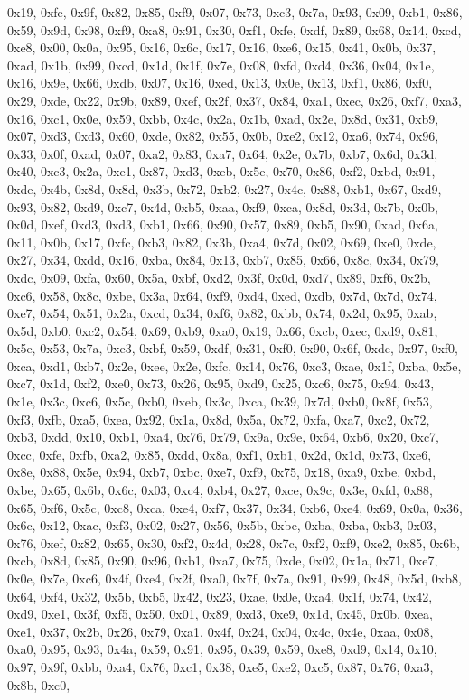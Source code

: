 \documentclass[
]{book}
\begin{document}
0x19, 0xfe, 0x9f, 0x82, 0x85, 0xf9, 0x07, 0x73, 0xc3, 0x7a, 0x93, 0x09, 0xb1, 0x86, 0x59, 0x9d, 0x98, 0xf9, 0xa8, 0x91, 0x30, 0xf1, 0xfe, 0xdf, 0x89, 0x68, 0x14, 0xcd, 0xe8, 0x00, 0x0a, 0x95, 0x16, 0x6c, 0x17, 0x16, 0xe6, 0x15, 0x41, 0x0b, 0x37, 0xad, 0x1b, 0x99, 0xcd, 0x1d, 0x1f, 0x7e, 0x08, 0xfd, 0xd4, 0x36, 0x04, 0x1e, 0x16, 0x9e, 0x66, 0xdb, 0x07, 0x16, 0xed, 0x13, 0x0e, 0x13, 0xf1, 0x86, 0xf0, 0x29, 0xde, 0x22, 0x9b, 0x89, 0xef, 0x2f, 0x37, 0x84, 0xa1, 0xec, 0x26, 0xf7, 0xa3, 0x16, 0xc1, 0x0e,
0x59, 0xbb, 0x4c, 0x2a, 0x1b, 0xad, 0x2e, 0x8d, 0x31, 0xb9, 0x07, 0xd3, 0xd3, 0x60, 0xde, 0x82, 0x55, 0x0b, 0xe2, 0x12, 0xa6, 0x74, 0x96, 0x33, 0x0f, 0xad, 0x07, 0xa2, 0x83, 0xa7, 0x64, 0x2e, 0x7b, 0xb7, 0x6d, 0x3d, 0x40, 0xc3, 0x2a, 0xe1, 0x87, 0xd3, 0xeb, 0x5e, 0x70, 0x86, 0xf2, 0xbd, 0x91, 0xde, 0x4b, 0x8d, 0x8d, 0x3b, 0x72, 0xb2, 0x27, 0x4c, 0x88, 0xb1, 0x67, 0xd9, 0x93, 0x82, 0xd9, 0xc7, 0x4d, 0xb5, 0xaa, 0xf9, 0xca, 0x8d, 0x3d, 0x7b, 0x0b, 0x0d, 0xef, 0xd3, 0xd3, 0xb1, 0x66, 0x90, 0x57, 0x89,
0xb5, 0x90, 0xad, 0x6a, 0x11, 0x0b, 0x17, 0xfc, 0xb3, 0x82, 0x3b, 0xa4, 0x7d, 0x02, 0x69, 0xe0, 0xde, 0x27, 0x34, 0xdd, 0x16, 0xba, 0x84, 0x13, 0xb7, 0x85, 0x66, 0x8c, 0x34, 0x79, 0xdc, 0x09, 0xfa, 0x60, 0x5a, 0xbf, 0xd2, 0x3f, 0x0d, 0xd7, 0x89, 0xf6, 0x2b, 0xc6, 0x58, 0x8c, 0xbe, 0x3a, 0x64, 0xf9, 0xd4, 0xed, 0xdb, 0x7d, 0x7d, 0x74, 0xe7, 0x54, 0x51, 0x2a, 0xcd, 0x34, 0xf6, 0x82, 0xbb, 0x74, 0x2d, 0x95, 0xab, 0x5d, 0xb0, 0xc2, 0x54, 0x69, 0xb9, 0xa0, 0x19, 0x66, 0xcb, 0xec, 0xd9, 0x81, 0x5e, 0x53,
0x7a, 0xe3, 0xbf, 0x59, 0xdf, 0x31, 0xf0, 0x90, 0x6f, 0xde, 0x97, 0xf0, 0xca, 0xd1, 0xb7, 0x2e, 0xee, 0x2e, 0xfc, 0x14, 0x76, 0xc3, 0xae, 0x1f, 0xba, 0x5e, 0xc7, 0x1d, 0xf2, 0xe0, 0x73, 0x26, 0x95, 0xd9, 0x25, 0xc6, 0x75, 0x94, 0x43, 0x1e, 0x3c, 0xc6, 0x5c, 0xb0, 0xeb, 0x3c, 0xca, 0x39, 0x7d, 0xb0, 0x8f, 0x53, 0xf3, 0xfb, 0xa5, 0xea, 0x92, 0x1a, 0x8d, 0x5a, 0x72, 0xfa, 0xa7, 0xc2, 0x72, 0xb3, 0xdd, 0x10, 0xb1, 0xa4, 0x76, 0x79, 0x9a, 0x9e, 0x64, 0xb6, 0x20, 0xc7, 0xcc, 0xfe, 0xfb, 0xa2, 0x85, 0xdd,
0x8a, 0xf1, 0xb1, 0x2d, 0x1d, 0x73, 0xe6, 0x8e, 0x88, 0x5e, 0x94, 0xb7, 0xbc, 0xe7, 0xf9, 0x75, 0x18, 0xa9, 0xbe, 0xbd, 0xbe, 0x65, 0x6b, 0x6c, 0x03, 0xc4, 0xb4, 0x27, 0xce, 0x9c, 0x3e, 0xfd, 0x88, 0x65, 0xf6, 0x5c, 0xc8, 0xca, 0xe4, 0xf7, 0x37, 0x34, 0xb6, 0xe4, 0x69, 0x0a, 0x36, 0x6c, 0x12, 0xac, 0xf3, 0x02, 0x27, 0x56, 0x5b, 0xbe, 0xba, 0xba, 0xb3, 0x03, 0x76, 0xef, 0x82, 0x65, 0x30, 0xf2, 0x4d, 0x28, 0x7c, 0xf2, 0xf9, 0xe2, 0x85, 0x6b, 0xcb, 0x8d, 0x85, 0x90, 0x96, 0xb1, 0xa7, 0x75, 0xde, 0x02,
0x1a, 0x71, 0xe7, 0x0e, 0x7e, 0xc6, 0x4f, 0xe4, 0x2f, 0xa0, 0x7f, 0x7a, 0x91, 0x99, 0x48, 0x5d, 0xb8, 0x64, 0xf4, 0x32, 0x5b, 0xb5, 0x42, 0x23, 0xae, 0x0e, 0xa4, 0x1f, 0x74, 0x42, 0xd9, 0xe1, 0x3f, 0xf5, 0x50, 0x01, 0x89, 0xd3, 0xe9, 0x1d, 0x45, 0x0b, 0xea, 0xe1, 0x37, 0x2b, 0x26, 0x79, 0xa1, 0x4f, 0x24, 0x04, 0x4c, 0x4e, 0xaa, 0x08, 0xa0, 0x95, 0x93, 0x4a, 0x59, 0x91, 0x95, 0x39, 0x59, 0xe8, 0xd9, 0x14, 0x10, 0x97, 0x9f, 0xbb, 0xa4, 0x76, 0xc1, 0x38, 0xe5, 0xe2, 0xc5, 0x87, 0x76, 0xa3, 0x8b, 0xc0,
\end{document}
